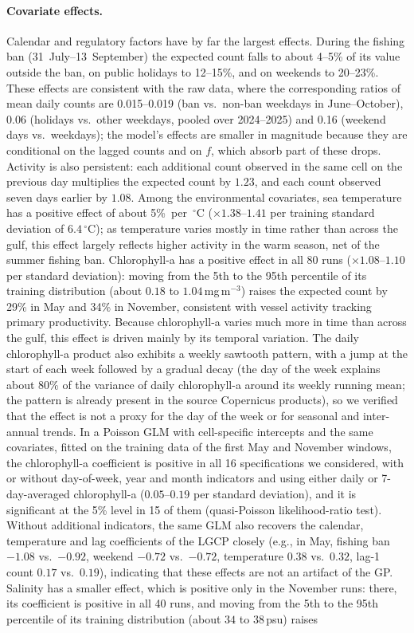 \paragraph{Covariate effects.}
Calendar and regulatory factors have by far the largest effects. During the fishing ban (31~July--13~September) the expected count falls to about 4--5\% of its value outside the ban, on public holidays to 12--15\%, and on weekends to 20--23\%. These effects are consistent with the raw data, where the corresponding ratios of mean daily counts are 0.015--0.019 (ban vs.\ non-ban weekdays in June--October), 0.06 (holidays vs.\ other weekdays, pooled over 2024--2025) and 0.16 (weekend days vs.\ weekdays); the model's effects are smaller in magnitude because they are conditional on the lagged counts and on $f$, which absorb part of these drops. Activity is also persistent: each additional count observed in the same cell on the previous day multiplies the expected count by $1.23$, and each count observed seven days earlier by $1.08$. Among the environmental covariates, sea temperature has a positive effect of about 5\%~per~$^\circ$C ($\times 1.38$--$1.41$ per training standard deviation of $6.4\,^\circ$C); as temperature varies mostly in time rather than across the gulf, this effect largely reflects higher activity in the warm season, net of the summer fishing ban. Chlorophyll-a has a positive effect in all 80 runs ($\times 1.08$--$1.10$ per standard deviation): moving from the 5th to the 95th percentile of its training distribution (about $0.18$ to $1.04$\,mg\,m$^{-3}$) raises the expected count by 29\% in May and 34\% in November, consistent with vessel activity tracking primary productivity. Because chlorophyll-a varies much more in time than across the gulf, this effect is driven mainly by its temporal variation. The daily chlorophyll-a product also exhibits a weekly sawtooth pattern, with a jump at the start of each week followed by a gradual decay (the day of the week explains about 80\% of the variance of daily chlorophyll-a around its weekly running mean; the pattern is already present in the source Copernicus products), so we verified that the effect is not a proxy for the day of the week or for seasonal and inter-annual trends. In a Poisson GLM with cell-specific intercepts and the same covariates, fitted on the training data of the first May and November windows, the chlorophyll-a coefficient is positive in all 16 specifications we considered, with or without day-of-week, year and month indicators and using either daily or 7-day-averaged chlorophyll-a ($0.05$--$0.19$ per standard deviation), and it is significant at the 5\% level in 15 of them (quasi-Poisson likelihood-ratio test). Without additional indicators, the same GLM also recovers the calendar, temperature and lag coefficients of the LGCP closely (e.g., in May, fishing ban $-1.08$ vs.\ $-0.92$, weekend $-0.72$ vs.\ $-0.72$, temperature $0.38$ vs.\ $0.32$, lag-1 count $0.17$ vs.\ $0.19$), indicating that these effects are not an artifact of the GP. Salinity has a smaller effect, which is positive only in the November runs: there, its coefficient is positive in all 40 runs, and moving from the 5th to the 95th percentile of its training distribution (about $34$ to $38$\,psu) raises 